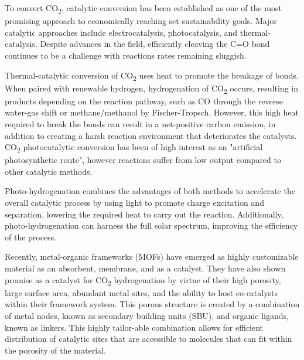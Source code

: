 \documentclass[twoside,twocolumn,9pt]{article}
\begin{document}
\par

To convert CO\textsubscript{2}, catalytic conversion has been established as one of the most promising approach to economically reaching set sustainability goals\cite{clark_circular_2016}. Major catalytic approaches include electrocatalysis\cite{segets_accelerating_2023}, photocatalysis\cite{alli_photocatalysts_2023}, and thermal-catalysis\cite{wen_recent_2025}. Despite advances in the field, efficiently cleaving the C=O bond continues to be a challenge with reactions rates remaining sluggish\cite{jin_advances_2021, zhao_progress_2017}. 

\par

Thermal-catalytic conversion of CO\textsubscript{2} uses heat to promote the breakage of bonds\cite{jadhav_catalytic_2014, roy_thermochemical_2018}. When paired with renewable hydrogen, hydrogenation of CO\textsubscript{2} occurs, resulting in products depending on the reaction pathway, such as CO through the reverse water-gas shift or methane/methanol by Fischer-Tropsch\cite{olah_chemical_2017}. However, this high heat required to break the bonds can result in a net-positive carbon emission, in addition to creating a harsh reaction environment that deteriorates the catalysts\cite{ye_design_2025}. CO\textsubscript{2} photocatalytic conversion has been of high interest as an "artificial photosynthetic route"\cite{alli_photocatalysts_2023}, however reactions suffer from low output compared to other catalytic methods\cite{liao_challenges_2024}. 

\par

Photo-hydrogenation combines the advantages of both methods to accelerate the overall catalytic process by using light to promote charge excitation and separation, lowering the required heat to carry out the reaction\cite{guo_state---art_2022, li_fe-based_2021}. Additionally, photo-hydrogenation can harness the full solar spectrum, improving the efficiency of the process\cite{long_efficient_2015}. 

\par

Recently, metal-organic frameworks (MOFs) have emerged as highly customizable material as an absorbent, membrane, and as a catalyst\cite{zhou_introduction_2012, furukawa_chemistry_2013, yaghi_reticular_2003}. They have also shown promise as a catalyst for CO\textsubscript{2} hydrogenation by virtue of their high porosity, large surface area, abundant metal sites, and the ability to host co-catalysts within their framework system\cite{ye_organic-inorganic_2023, zhai_photo-thermal_2024, stanley_analysis_2024, wang_dual_2026}. This porous structure is created by a combination of metal nodes, known as secondary building units (SBU), and organic ligands, known as linkers. This highly tailor-able combination allows for efficient distribution of catalytic sites that are accessible to molecules that can fit within the porosity of the material\cite{doi:10.1126/science.1230444, maina_metal_2017, li_integration_2014, dou_hierarchically_2020}.
\end{document}
